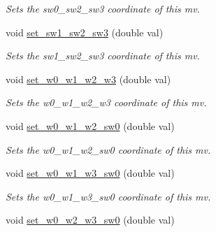 \begin{DoxyCompactItemize}
\begin{DoxyCompactList}\small\item\em Sets the sw0\-\_\-sw2\-\_\-sw3 coordinate of this mv. \end{DoxyCompactList}\item 
\hypertarget{classe3ga_1_1mv_ac6927911f5128a4a018fb23fdbe6d42b}{void \hyperlink{classe3ga_1_1mv_ac6927911f5128a4a018fb23fdbe6d42b}{set\-\_\-sw1\-\_\-sw2\-\_\-sw3} (double val)}\label{classe3ga_1_1mv_ac6927911f5128a4a018fb23fdbe6d42b}

\begin{DoxyCompactList}\small\item\em Sets the sw1\-\_\-sw2\-\_\-sw3 coordinate of this mv. \end{DoxyCompactList}\item 
\hypertarget{classe3ga_1_1mv_aed241c3e2248f4aeec6167575c06eb31}{void \hyperlink{classe3ga_1_1mv_aed241c3e2248f4aeec6167575c06eb31}{set\-\_\-w0\-\_\-w1\-\_\-w2\-\_\-w3} (double val)}\label{classe3ga_1_1mv_aed241c3e2248f4aeec6167575c06eb31}

\begin{DoxyCompactList}\small\item\em Sets the w0\-\_\-w1\-\_\-w2\-\_\-w3 coordinate of this mv. \end{DoxyCompactList}\item 
\hypertarget{classe3ga_1_1mv_a23476c265ca787ffd0b69ece6acaccbc}{void \hyperlink{classe3ga_1_1mv_a23476c265ca787ffd0b69ece6acaccbc}{set\-\_\-w0\-\_\-w1\-\_\-w2\-\_\-sw0} (double val)}\label{classe3ga_1_1mv_a23476c265ca787ffd0b69ece6acaccbc}

\begin{DoxyCompactList}\small\item\em Sets the w0\-\_\-w1\-\_\-w2\-\_\-sw0 coordinate of this mv. \end{DoxyCompactList}\item 
\hypertarget{classe3ga_1_1mv_a97028218c6a6859e2d500c5c0ab40df4}{void \hyperlink{classe3ga_1_1mv_a97028218c6a6859e2d500c5c0ab40df4}{set\-\_\-w0\-\_\-w1\-\_\-w3\-\_\-sw0} (double val)}\label{classe3ga_1_1mv_a97028218c6a6859e2d500c5c0ab40df4}

\begin{DoxyCompactList}\small\item\em Sets the w0\-\_\-w1\-\_\-w3\-\_\-sw0 coordinate of this mv. \end{DoxyCompactList}\item 
\hypertarget{classe3ga_1_1mv_aa5f3123c7552eac6664eaab62bc44296}{void \hyperlink{classe3ga_1_1mv_aa5f3123c7552eac6664eaab62bc44296}{set\-\_\-w0\-\_\-w2\-\_\-w3\-\_\-sw0} (double val)}\label{classe3ga_1_1mv_aa5f3123c7552eac6664eaab62bc44296}


\end{DoxyCompactItemize}
